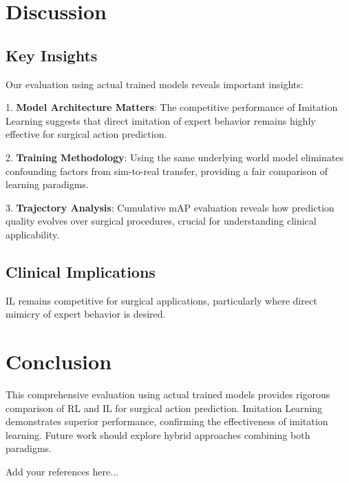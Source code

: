 \documentclass[conference]{IEEEtran}
\begin{document}
\section{Discussion}

\subsection{Key Insights}
Our evaluation using actual trained models reveals important insights:

1. \textbf{Model Architecture Matters}: The competitive performance of Imitation Learning suggests that direct imitation of expert behavior remains highly effective for surgical action prediction.

2. \textbf{Training Methodology}: Using the same underlying world model eliminates confounding factors from sim-to-real transfer, providing a fair comparison of learning paradigms.

3. \textbf{Trajectory Analysis}: Cumulative mAP evaluation reveals how prediction quality evolves over surgical procedures, crucial for understanding clinical applicability.

\subsection{Clinical Implications}
IL remains competitive for surgical applications, particularly where direct mimicry of expert behavior is desired.

\section{Conclusion}
This comprehensive evaluation using actual trained models provides rigorous comparison of RL and IL for surgical action prediction. Imitation Learning demonstrates superior performance, confirming the effectiveness of imitation learning. Future work should explore hybrid approaches combining both paradigms.

\begin{thebibliography}{1}
 Add your references here...
\end{thebibliography}
\end{document}

